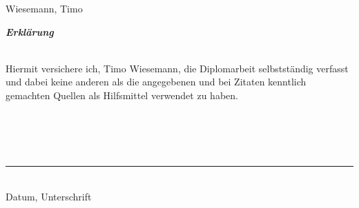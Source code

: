 \newpage
\thispagestyle{empty}
Wiesemann, Timo \\

\begin{center}
  \textit{\textbf{Erklärung}}
\end{center}

\hspace*{60mm}\\

Hiermit versichere ich, Timo Wiesemann, die Diplomarbeit selbstständig verfasst und dabei keine anderen als die angegebenen und bei Zitaten kenntlich gemachten Quellen als Hilfsmittel verwendet zu haben.
\bigskip
\\
\\
\\
\\
\\
\begin{minipage}{25cm}
  \begin{flushright}
    \begin{center}
      \rule{7cm}{0.2mm}\\
      Datum, Unterschrift
      \end{center}
  \end{flushright}
\end{minipage}
\newpage
